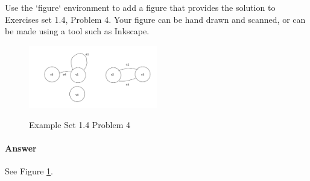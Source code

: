 \documentclass{article}
\begin{document}
\parbox[t]{\linewidth}{\hangindent=7mm }

\collab{\todo{}}

Use the `figure` environment to add a figure that provides the solution to
Exercises set 1.4, Problem 4.  Your figure can be hand drawn and scanned, or can
be made using a tool such as Inkscape.


\begin{figure}
\caption{Example Set 1.4 Problem 4}
\centering
\includegraphics[width=0.5\textwidth]{figure}
\label{problem4}
\end{figure}
\paragraph{Answer} See Figure \ref{problem4}.
\end{document}
